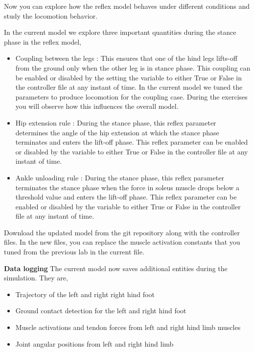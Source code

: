 \documentclass{cmc}
\begin{document}
Now you can explore how the reflex model behaves under different
conditions and study the locomotion behavior.

In the current model we explore three important quantities during the
stance phase in the reflex model,
\begin{itemize}
\item Coupling between the legs : This ensures that one of the hind
  legs lifts-off from the ground only when the other leg is in stance
  phase. This coupling can be enabled or disabled by the setting the
  variable  to either True or False in the
   controller file at any instant of time. In the
  current model we tuned the parameters to produce locomotion for the
  coupling case.  During the exercises you will observe how this
  influences the overall model.
\item Hip extension rule : During the stance phase, this reflex
  parameter determines the angle of the hip extension at which the
  stance phase terminates and enters the lift-off phase. This reflex
  parameter can be enabled or disabled by the variable
   to either True or False in the
   controller file at any instant of time.
\item Ankle unloading rule : During the stance phase, this reflex
  parameter terminates the stance phase when the force in soleus
  muscle drops below a threshold value and enters the lift-off
  phase. This reflex parameter can be enabled or disabled by the
  variable  to either True or
  False in the  controller file at any instant of time.
\end{itemize}

Download the updated model from the git repository along with the
controller files. In the new files, you can replace the muscle
activation constants that you tuned from the previous lab in the
current  file.

\newpage
\textbf{Data logging} The current model now saves additional entities
during the simulation. They are,
\begin{itemize}
\item Trajectory of the left and right right hind foot
\item Ground contact detection for the left and right hind foot
\item Muscle activations and tendon forces from left and right hind
  limb muscles
\item Joint angular positions from left and right hind limb
\end{itemize}
\end{document}
